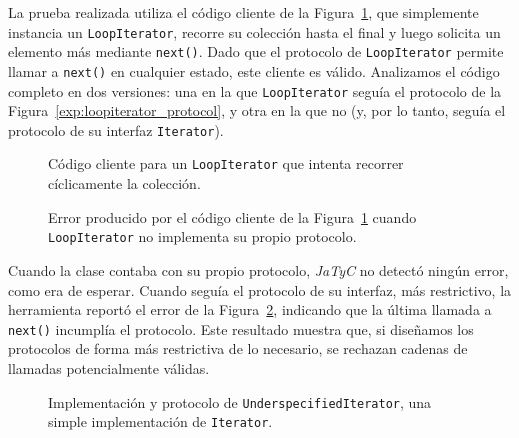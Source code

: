 La prueba realizada utiliza el código cliente de la Figura~\ref{exp:restrictive-iterator:client}, que simplemente instancia un \texttt{LoopIterator}, recorre su colección hasta el final y luego solicita un elemento más mediante \texttt{next()}. Dado que el protocolo de \texttt{LoopIterator} permite llamar a \texttt{next()} en cualquier estado, este cliente es válido. Analizamos el código completo en dos versiones: una en la que \texttt{LoopIterator} seguía el protocolo de la Figura~\ref{exp:loopiterator_protocol}, y otra en la que no (y, por lo tanto, seguía el protocolo de su interfaz \texttt{Iterator}).

\begin{figure}[htbp]
    \centering
    
    \caption{Código cliente para un \texttt{LoopIterator} que intenta recorrer cíclicamente la colección.}
    \label{exp:restrictive-iterator:client}
\end{figure}

\begin{figure}[htbp]
    \centering
    
    \caption{Error producido por el código cliente de la Figura~\ref{exp:restrictive-iterator:client} cuando \texttt{LoopIterator} no implementa su propio protocolo.}
    \label{exp:restrictive-iterator:error}
\end{figure}

Cuando la clase contaba con su propio protocolo, \textit{JaTyC} no detectó ningún error, como era de esperar. Cuando seguía el protocolo de su interfaz, más restrictivo, la herramienta reportó el error de la Figura~\ref{exp:restrictive-iterator:error}, indicando que la última llamada a \texttt{next()} incumplía el protocolo. Este resultado muestra que, si diseñamos los protocolos de forma más restrictiva de lo necesario, se rechazan cadenas de llamadas potencialmente válidas.

\begin{figure}[htbp]
    \centering
    
    \vspace{0.3cm}
    
    \caption{Implementación y protocolo de \texttt{UnderspecifiedIterator}, una simple implementación de \texttt{Iterator}.}
    \label{exp:underspecified-iterator}
\end{figure}

